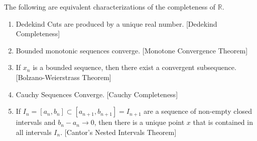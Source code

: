 \documentclass[crop=false,class=book]{standalone}
\begin{document}
\begin{theorem}
The following are equivalent characterizations of the completeness of $\mathbb{R}$.
\begin{enumerate}
    \item Dedekind Cuts are produced by a unique real number. \hfill [Dedekind Completeness]
    \item Bounded monotonic sequences converge. \hfill [Monotone Convergence Theorem]
    \item If $x_n$ is a bounded sequence, then there exist a convergent subsequence. \hfill [Bolzano-Weierstrass Theorem]
    \item Cauchy Sequences Converge. \hfill [Cauchy Completeness]
    \item If $I_n = [a_n,b_n]\subset [a_{n+1},b_{n+1}]=I_{n+1}$ are a sequence of non-empty closed intervals and $b_n-a_n \rightarrow 0$, then there is a unique point $x$ that is contained in all intervals $I_n$. \hfill [Cantor's Nested Intervals Theorem]
\end{enumerate}
\end{theorem}
\end{document}
